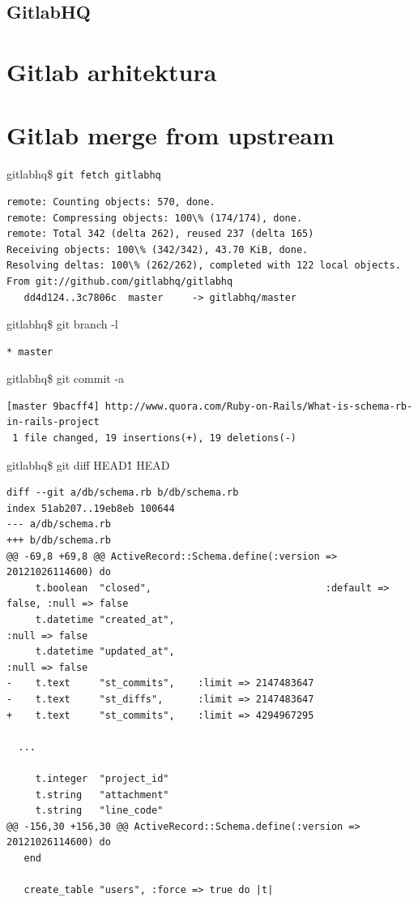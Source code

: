 \section{GitlabHQ}

\chapter{Gitlab arhitektura}

\chapter{Gitlab merge from upstream}

gitlabhq\$ \texttt{git fetch gitlabhq}
\begin{lstlisting}
remote: Counting objects: 570, done.
remote: Compressing objects: 100\% (174/174), done.
remote: Total 342 (delta 262), reused 237 (delta 165)
Receiving objects: 100\% (342/342), 43.70 KiB, done.
Resolving deltas: 100\% (262/262), completed with 122 local objects.
From git://github.com/gitlabhq/gitlabhq
   dd4d124..3c7806c  master     -> gitlabhq/master
\end{lstlisting}


gitlabhq\$ git branch -l
\begin{lstlisting}
* master
\end{lstlisting}


gitlabhq\$ git commit -a
\begin{lstlisting}
[master 9bacff4] http://www.quora.com/Ruby-on-Rails/What-is-schema-rb-in-rails-project
 1 file changed, 19 insertions(+), 19 deletions(-)
\end{lstlisting}



gitlabhq\$ git diff HEAD\^1 HEAD
\begin{lstlisting}
diff --git a/db/schema.rb b/db/schema.rb
index 51ab207..19eb8eb 100644
--- a/db/schema.rb
+++ b/db/schema.rb
@@ -69,8 +69,8 @@ ActiveRecord::Schema.define(:version => 20121026114600) do
     t.boolean  "closed",                              :default => false, :null => false
     t.datetime "created_at",                                             :null => false
     t.datetime "updated_at",                                             :null => false
-    t.text     "st_commits",    :limit => 2147483647
-    t.text     "st_diffs",      :limit => 2147483647
+    t.text     "st_commits",    :limit => 4294967295

  ...

     t.integer  "project_id"
     t.string   "attachment"
     t.string   "line_code"
@@ -156,30 +156,30 @@ ActiveRecord::Schema.define(:version => 20121026114600) do
   end
 
   create_table "users", :force => true do |t|
\end{lstlisting}


